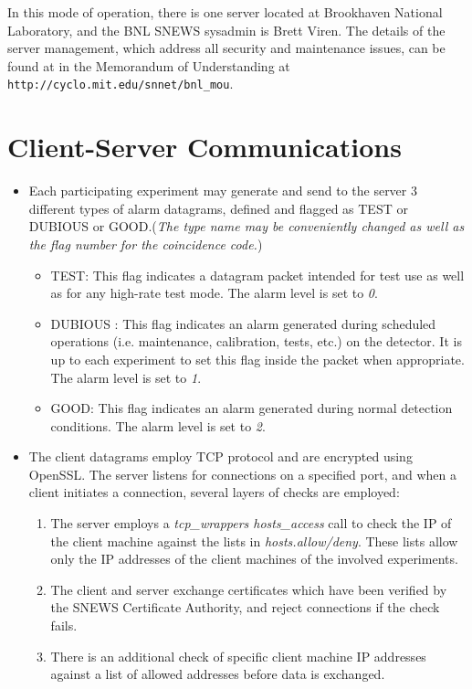\documentclass{article}
\begin{document}
In this mode of operation, there is one server located at Brookhaven
National Laboratory, and the BNL SNEWS sysadmin is Brett Viren.
The details of the server management, which address all
security and maintenance issues, can be found at
in the Memorandum of Understanding at\\
{\tt http://cyclo.mit.edu/snnet/bnl\_mou}.

\section{Client-Server Communications}\label{alarm}
\begin{itemize}
\item Each participating experiment may generate and send to the server
3 different types of alarm datagrams, defined and 
flagged as TEST or DUBIOUS or GOOD.({\it The type name may be conveniently 
changed as well as the flag number for the coincidence code.})
\begin{itemize}

\item TEST: This flag indicates a datagram packet intended for test use
as well as for any high-rate test mode.  The alarm level
is set to {\it 0}.

\item DUBIOUS : This flag indicates an alarm
generated during scheduled operations
(i.e. maintenance, calibration, tests, etc.) on the detector. It is
up to each experiment to set this flag inside the packet when appropriate.
The alarm level is set to
{\it 1}.

\item GOOD: This flag indicates an alarm generated during
normal detection conditions.  The alarm level is set to {\it 2}.

\end{itemize}
 

\item The client datagrams employ TCP protocol and 
are encrypted using OpenSSL.  
The server listens for connections on a specified port,
and when a client initiates a connection, several layers
of checks are employed:
\begin{enumerate}
\item The server employs a {\it tcp\_wrappers hosts\_access}
call to check the IP of the client machine against the lists in
{\it hosts.allow/deny}.  These lists allow only the IP addresses
of the client machines of the involved experiments.
\item
The client and server exchange certificates which have been
verified by the SNEWS Certificate Authority, and reject
connections if the check fails.
\item There is an additional check of specific client machine
IP addresses against a list of allowed addresses before data is exchanged.
\end{enumerate}
\end{itemize}
\end{document}
